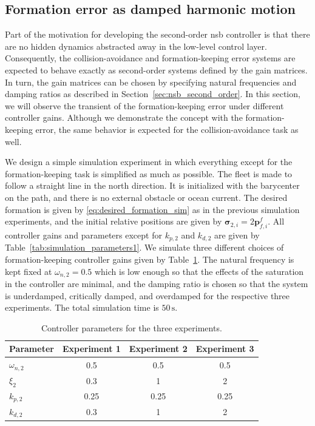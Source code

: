 \subsection{Formation error as damped harmonic motion}\label{sec:harmonic_motion}
Part of the motivation for developing the second-order \gls{nsb} controller is that there are no hidden dynamics abstracted away in the low-level control layer. Consequently, the collision-avoidance and formation-keeping error systems are expected to behave exactly as second-order systems defined by the gain matrices. In turn, the gain matrices can be chosen by specifying natural frequencies and damping ratios as described in Section~\ref{sec:nsb_second_order}. In this section, we will observe the transient of the formation-keeping error under different controller gains. Although we demonstrate the concept with the formation-keeping error, the same behavior is expected for the collision-avoidance task as well.

We design a simple simulation experiment in which everything except for the formation-keeping task is simplified as much as possible. The fleet is made to follow a straight line in the north direction. It is initialized with the barycenter on the path, and there is no external obstacle or ocean current. The desired formation is given by \eqref{eq:desired_formation_sim} as in the previous simulation experiments, and the initial relative positions are given by $\bm{\sigma}_{2,i} = 2\mathbf{p}_{f,i}^f$. All controller gains and parameters except for $k_{p,2}$ and $k_{d,2}$ are given by Table~\ref{tab:simulation_parameters1}. We simulate three different choices of formation-keeping controller gains given by Table~\ref{tab:controller-params}. The natural frequency is kept fixed at $\omega_{n,2} = 0.5$ which is low enough so that the effects of the saturation in the controller are minimal, and the damping ratio is chosen so that the system is underdamped, critically damped, and overdamped for the respective three experiments. The total simulation time is $50\, \mathrm{s}$.

\begin{table}[h]
\centering
\caption{Controller parameters for the three experiments.}
\label{tab:controller-params}
\begin{tabular}{lccc}
\hline
Parameter & Experiment 1 & Experiment 2 & Experiment 3 \\ \hline
$\omega_{n,2}$ & 0.5 & 0.5 & 0.5 \\
$\xi_2$ & 0.3 & 1 & 2 \\
$k_{p,2}$ & 0.25 & 0.25 & 0.25 \\
$k_{d,2}$ & 0.3 & 1 & 2 \\ \hline
\end{tabular}
\end{table}

